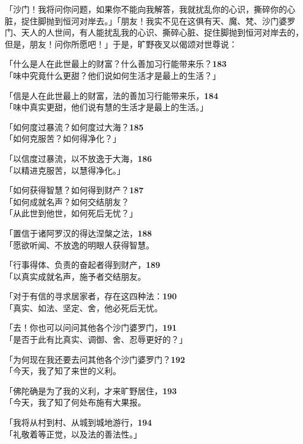 「沙门！我将问你问题，如果你不能向我解答，我就扰乱你的心识，撕碎你的心脏，捉住脚抛到恒河对岸去。」「朋友！我实不见在这俱有天、魔、梵、沙门婆罗门、天人的人世间，有人能扰乱我的心识、撕碎心脏、捉住脚抛到恒河对岸去的，但是，朋友！问你所愿吧！」于是，旷野夜叉以偈颂对世尊说：


「什么是人在此世最上的财富？什么善加习行能带来乐？\hfill{\grayfootnotesize \textbf{183}} \\
「味中究竟什么更甜？他们说如何生活才是最上的生活？」


「信是人在此世最上的财富，法的善加习行能带来乐，\hfill{\grayfootnotesize \textbf{184}} \\
「味中真实更甜，他们说有慧的生活才是最上的生活。」


「如何度过暴流？如何度过大海？\hfill{\grayfootnotesize \textbf{185}} \\
「如何克服苦？如何得净化？」


「以信度过暴流，以不放逸于大海，\hfill{\grayfootnotesize \textbf{186}} \\
「以精进克服苦，以慧得净化。」


「如何获得智慧？如何得到财产？\hfill{\grayfootnotesize \textbf{187}} \\
「如何成就名声？如何交结朋友？\\
「从此世到他世，如何死后无忧？」


「置信于诸阿罗汉的得达涅槃之法，\hfill{\grayfootnotesize \textbf{188}} \\
「愿欲听闻、不放逸的明眼人获得智慧。


「行事得体、负责的奋起者得到财产，\hfill{\grayfootnotesize \textbf{189}} \\
「以真实成就名声，施予者交结朋友。


「对于有信的寻求居家者，存在这四种法：\hfill{\grayfootnotesize \textbf{190}} \\
「真实、如法、坚定、舍，他必死后无忧。


「去！你也可以问问其他各个沙门婆罗门，\hfill{\grayfootnotesize \textbf{191}} \\
「是否于此有比真实、调御、舍、忍辱更好的？」


「为何现在我还要去问其他各个沙门婆罗门？\hfill{\grayfootnotesize \textbf{192}} \\
「今天，我了知了来世的义利。


「佛陀确是为了我的义利，才来旷野居住，\hfill{\grayfootnotesize \textbf{193}} \\
「今天，我了知了何处布施有大果报。


「我将从村到村、从城到城地游行，\hfill{\grayfootnotesize \textbf{194}} \\
「礼敬着等正觉，以及法的善法性。」



